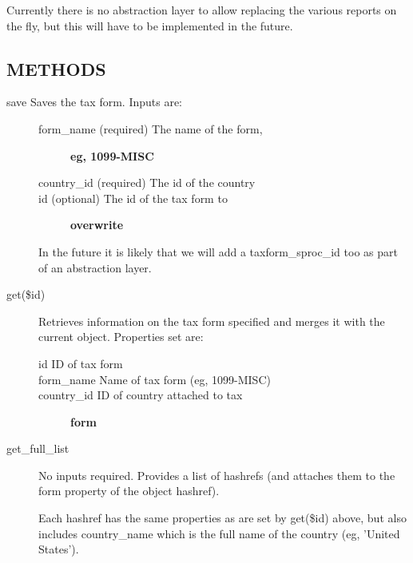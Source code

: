 \begin{description}
\begin{description}
\begin{description}
\begin{description}
\begin{description}
\begin{description}
\begin{description}
\begin{description}
\begin{description}
\begin{description}
Currently there is no abstraction layer to allow replacing the various reports
on the fly, but this will have to be implemented in the future.

\subsection*{METHODS\label{LedgerSMB::DBObject::TaxFormm_METHODS}}
\begin{description}

\item[{save
Saves the tax form. Inputs are:}] \mbox{}\begin{description}

\item[{form\_name (required) The name of the form,}] \textbf{eg, 1099-MISC}
\item[{country\_id (required) The id of the country}] \mbox{}
\item[{id (optional) The id of the tax form to}] \textbf{overwrite}\end{description}


In the future it is likely that we will add a taxform\_sproc\_id too as part of
an abstraction layer.


\item[{get(\$id)}] \mbox{}

Retrieves information on the tax form specified and merges it with the current
object.  Properties set are:

\begin{description}

\item[{id
ID of tax form}] \mbox{}
\item[{form\_name Name of tax form (eg, 1099-MISC)}] \mbox{}
\item[{country\_id ID of country attached to tax}] \textbf{form}\end{description}

\item[{get\_full\_list}] \mbox{}

No inputs required.  Provides a list of hashrefs (and attaches them to the 
form property of the object hashref).



Each hashref has the same properties as are set by get(\$id) above, but also
includes country\_name which is the full name of the country (eg, 'United 
States').




\end{description}
\end{description}
\end{description}
\end{description}
\end{description}
\end{description}
\end{description}
\end{description}
\end{description}
\end{description}
\end{description}
